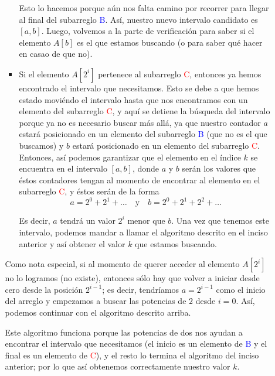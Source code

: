 \documentclass[letterpaper,11pt]{article}
\begin{document}
\begin{enumerate}
\begin{enumerate}
\begin{itemize}
            Esto lo hacemos porque aún nos falta camino por recorrer para llegar 
            al final del subarreglo \textcolor{blue}{B}. Así, nuestro nuevo 
            intervalo candidato es $[a, b]$. Luego, volvemos a la parte de 
            verificación para saber si el elemento $A[b]$ es el que estamos 
            buscando (o para saber qué hacer en casao de que no).

            \item Si el elemento $A[2^i]$ pertenece al subarreglo 
            \textcolor{red}{C}, entonces ya hemos encontrado el intervalo que 
            necesitamos. Esto se debe a que hemos estado moviéndo el intervalo 
            hasta que nos encontramos con un elemento del subarreglo 
            \textcolor{red}{C}, y aquí se detiene la búsqueda del intervalo 
            porque ya no es necesario buscar más allá, ya que nuestro contador 
            $a$ estará posicionado en un elemento del subarreglo 
            \textcolor{blue}{B} (que no es el que buscamos) y $b$ estará 
            posicionado en un elemento del subarreglo \textcolor{red}{C}. 
            Entonces, así podemos garantizar que el elemento en el índice $k$
            se encuentra en el intervalo $[a, b]$, donde $a$ y $b$ serán los 
            valores que éstos contadores tengan al momento de encontrar al 
            elemento en el subarreglo \textcolor{red}{C}, y éstos serán de 
            la forma 
            \begin{equation*}
                a = 2^0 + 2^1 + \ldots 
                \quad \text{y} \quad 
                b = 2^0 + 2^1 + 2^2 + \dots
            \end{equation*}

            Es decir, $a$ tendrá un valor $2^i$ menor que $b$. Una vez que 
            tenemos este intervalo, podemos mandar a llamar el algoritmo 
            descrito en el inciso anterior y así obtener el valor $k$ que 
            estamos buscando.
        \end{itemize}

        Como nota especial, si al momento de querer acceder al elemento $A[2^i]$
        no lo logramos (no existe), entonces sólo hay que volver a iniciar desde 
        cero desde la posición $2^{i-1}$; es decir, tendríamos $a = 2^{i-1}$ 
        como el inicio del arreglo y empezamos a buscar las potencias de $2$
        desde $i = 0$. Así, podemos continuar con el algoritmo descrito arriba.

        Este algoritmo funciona porque las potencias de dos nos ayudan a 
        encontrar el intervalo que necesitamos (el inicio es un elemento de 
        \textcolor{blue}{B} y el final es un elemento de \textcolor{red}{C}), y 
        el resto lo termina el algoritmo del inciso anterior; por lo que así 
        obtenemos correctamente nuestro valor $k$. 


\end{enumerate}
\end{enumerate}
\end{document}
